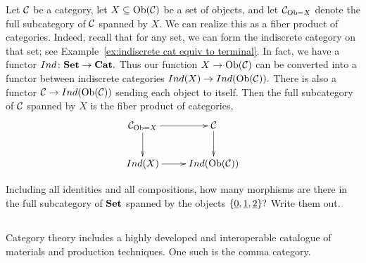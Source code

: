 \documentclass[CT4S-EN-RU]{subfiles}
\begin{document}
\begin{remarkRUS}
\end{remarkRUS}

\begin{exampleENG}
Let $\mathcal{C}$ be a category, let $X\subseteq\textnormal{Ob}(\mathcal{C})$ be a set of objects, and let $\mathcal{C}_{\textnormal{Ob}=X}$ denote the full subcategory of $\mathcal{C}$ spanned by $X.$ We can realize this as a fiber product of categories. Indeed, recall that for any set, we can form the indiscrete category on that set; see Example~\ref{ex:indiscrete cat equiv to terminal}. In fact, we have a functor $Ind\colon{\mathbf{Set}}\rightarrow{\mathbf{Cat}}.$ Thus our function $X\rightarrow\textnormal{Ob}(\mathcal{C})$ can be converted into a functor between indiscrete categories $Ind(X)\rightarrow Ind(\textnormal{Ob}(\mathcal{C})).$ There is also a functor $\mathcal{C}\rightarrow Ind(\textnormal{Ob}(\mathcal{C}))$ sending each object to itself. Then the full subcategory of $\mathcal{C}$ spanned by $X$ is the fiber product of categories,
$$\xymatrix{\mcC_{\Ob=X}\ar[r]\ar[d]&\mcC\ar[d]\\Ind(X)\ar[r]&Ind(\Ob(\mcC))}$$
\end{exampleENG}

\begin{exampleRUS}
\end{exampleRUS}

\begin{exerciseENG}
Including all identities and all compositions, how many morphisms are there in the full subcategory of ${\mathbf{Set}}$ spanned by the objects $\{\underline{0},\underline{1},\underline{2}\}?$ Write them out.
\end{exerciseENG}

\begin{exerciseRUS}
\end{exerciseRUS}


\subsection{}\label{sec:comma}

\begin{blockENG}
Category theory includes a highly developed and interoperable catalogue of materials and production techniques. One such is the comma category.
\end{blockENG}

\begin{blockRUS}
\end{blockRUS}
\end{document}
